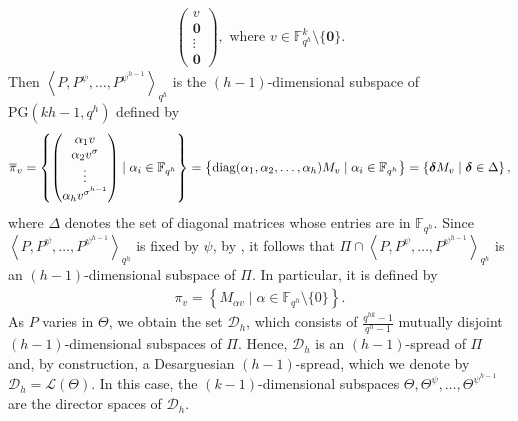 \documentclass[11pt]{article}
\theoremstyle{definition}
\numberwithin{equation}{section}
\def\d{{\boldsymbol \delta}}
\def\0{\mathbf 0}
\def\cD{\mathcal D}
\def\PG{\mathrm{PG}}
\def\F{{\mathbb F}}
\def\diag{{\rm diag}}
\begin{document}
\begin{align}
\begin{pmatrix}
v \\
\0 \\
\vdots \\
\0
\end{pmatrix}, \mbox{ where } v \in \F_{q^h}^k \setminus \{\0\}. \label{rep_P}
\end{align}
Then $\left\langle P, P^\psi, \dots, P^{\psi^{h-1}} \right\rangle_{q^h}$ is the $(h-1)$-dimensional subspace of $\PG(kh-1, q^h)$ defined by 
\begin{align}
\overline{\pi} _{v} = \left\{ \begin{pmatrix}
\alpha_1 v \\
\alpha_2 v^\sigma \\
\vdots \\
\alpha_h v^{\sigma^{h-1}}
\end{pmatrix} \mid \alpha_i \in \F_{q^h} \right\} = 
\left\{\diag(\alpha_1, \alpha_2, \dots, \alpha_{h}) M_v \mid  \alpha_i \in \F_{q^h} \right\} = 
\left\{\d M_v \mid \d \in \Delta\right\},  \label{rep_pi}
\end{align}
where $\Delta$ denotes the set of diagonal matrices whose entries are in $\F_{q^h}$. Since $\left\langle P, P^\psi, \dots, P^{\psi^{h-1}} \right\rangle_{q^h}$ is fixed by $\psi$, by \cite[Lemma 1]{lunardon1999normal}, it follows that $\Pi \cap \left\langle P, P^\psi, \dots, P^{\psi^{h-1}} \right\rangle_{q^h}$ is an $(h-1)$-dimensional subspace of $\Pi$. In particular, it is defined by 
\begin{align*}
\pi_v = \left\{ M_{\alpha v} \mid \alpha \in \F_{q^h} \setminus \{0\} \right\}.
\end{align*}
As $P$ varies in $\Theta$, we obtain the set $\cD_h$, which consists of $\frac{q^{hk} - 1}{q^{h} - 1}$ mutually disjoint $(h-1)$-dimensional subspaces of $\Pi$. Hence, $\mathcal D_h$ is an $(h-1)$-spread of $\Pi$ and, by construction, a
Desarguesian $(h-1)$-spread, which we denote by
$\mathcal D_h = \mathcal L(\Theta)$.
In this case, the $(k-1)$-dimensional subspaces
$\Theta, \Theta^{\psi}, \ldots, \Theta^{\psi^{h-1}}$
are the director spaces of $\mathcal D_h$.
 
\end{document}
